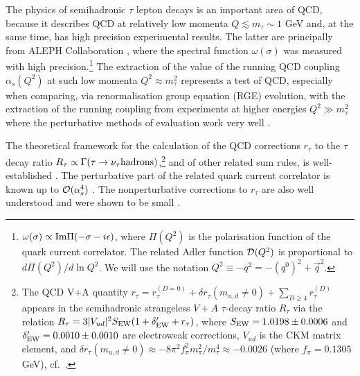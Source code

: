 \documentclass[aps,nofootinbib,showkeys,noshowpacs,preprintnumbers,amsmath,amssymb]{revtex4}
\begin{document}
The physics of semihadronic $\tau$ lepton decays is an important area of QCD, because it describes QCD at relatively low momenta $Q \lesssim m_{\tau} \sim 1$ GeV and, at the same time, has high precision experimental results. The latter are principally from ALEPH Collaboration \cite{ALEPH2,DDHMZ,ALEPHfin,ALEPHwww}, where the spectral function $\omega(\sigma)$ was measured with high precision.\footnote{$\omega(\sigma) \propto {\rm Im} \Pi(-\sigma - i \epsilon)$, where $\Pi(Q^2)$ is the polarisation function of the quark current correlator. The related Adler function ${\cal D}(Q^2)$ is proportional to $d \Pi(Q^2)/d \ln Q^2$. We will use  the notation $Q^2 \equiv - q^2 = - (q^0)^2 + {\vec q}^2$.} The extraction of the value of the running QCD coupling $\alpha_s(Q^2)$ at such low momenta $Q^2 \approx m^2_{\tau}$ represents a test of QCD, especially when comparing, via renormalisation group equation (RGE) evolution, with the extraction of the running coupling from experiments at higher energies $Q^2 \gg m^2_{\tau}$ where the perturbative methods of evaluation work very well \cite{DBTrev,alpha2019,PDG2020}.

The theoretical framework for the calculation of the QCD corrections $r_{\tau}$ to the $\tau$ decay ratio $R_{\tau} \propto \Gamma(\tau \to \nu_{\tau} {\rm hadrons})$,\footnote{The QCD V+A quantity $r_{\tau}=r_{\tau}^{(D=0)} + \delta r_{\tau}(m_{u,d} \not= 0) + \sum_{D \geq 4} r_{\tau}^{(D)}$ appears in the semihadronic strangeless $V+A$ $\tau$-decay ratio $R_{\tau}$ via the relation $R_{\tau}= 3 |V_{ud}|^2 S_{\rm EW} ( 1 + \delta'_{\rm EW} + r_{\tau})$, where $S_{\rm EW}=1.0198 \pm 0.0006$ \cite{SEW} and $\delta'_{\rm EW}=0.0010 \pm 0.0010$ \cite{dpEW} are electroweak corrections, $V_{ud}$ is the CKM matrix element, and $\delta r_{\tau}(m_{u,d} \not= 0) \approx - 8 \pi^2 f_{\pi}^2 m_{\pi}^2/m_{\tau}^4 \approx -0.0026$ (where $f_{\pi}=0.1305$ GeV), cf.~\cite{NP88,B88B89,BNP92,GCTK01}.}
  and of other related sum rules, is well-established \cite{NP88,B88B89,BNP92}. The perturbative part of the related quark current correlator is known up to ${\cal O}(\alpha_s^4)$ \cite{BCK}. The nonperturbative corrections to $r_{\tau}$ are also well understood and were shown to be small \cite{BNP92,DP92}.
\end{document}
